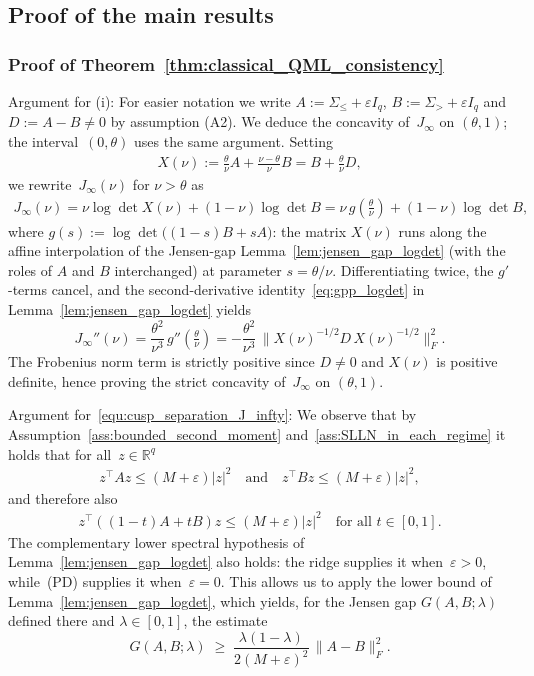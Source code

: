\documentclass[10pt, letterpaper]{amsart}
\begin{document}
\subsection{Proof of the main results}\label{sec:proof_main_results}

\subsubsection{Proof of Theorem~\ref{thm:classical_QML_consistency}}\label{sec:proof_consistency_infinite_signal_to_noise_ratio} 
Argument for (i): For easier notation we write $A:=\Sigma_{\le}+\varepsilon I_q$, $B:=\Sigma_{>}+\varepsilon I_q$ and $D:=A-B\neq 0$ by assumption (A2). We deduce the concavity of~$J_\infty$ on $(\theta,1)$; the interval~$(0,\theta)$ uses the same argument. Setting
\begin{align}
    X(\nu):=\frac{\theta}{\nu}A+\frac{\nu-\theta}{\nu}B
= B+\frac{\theta}{\nu}D ,
\end{align}
we rewrite~$J_\infty(\nu)$ for $\nu>\theta$ as
\begin{align}
J_\infty(\nu)=\nu\log\det X(\nu) + (1-\nu)\log\det B
=\nu\, g\!\left(\tfrac{\theta}{\nu}\right)+(1-\nu)\log\det B,
\end{align}
where $g(s):=\log\det\bigl((1-s)B+sA\bigr)$: the matrix $X(\nu)$ runs along the affine interpolation of the Jensen-gap Lemma~\ref{lem:jensen_gap_logdet} (with the roles of $A$ and $B$ interchanged) at parameter $s=\theta/\nu$. Differentiating twice, the $g'$-terms cancel, and the second-derivative identity~\eqref{eq:gpp_logdet} in Lemma~\ref{lem:jensen_gap_logdet} yields
\[
J_\infty''(\nu)
=\frac{\theta^2}{\nu^3}\, g''\!\left(\tfrac{\theta}{\nu}\right)
=
-\frac{\theta^2}{\nu^3}\,\big\|X(\nu)^{-1/2}D\,X(\nu)^{-1/2}\big\|_F^2.
\]
The Frobenius norm term is strictly positive since $D\neq 0$ and $X(\nu)$ is positive definite, hence proving the strict concavity of~$J_\infty$ on $(\theta,1)$.\smallskip

Argument for~\eqref{equ:cusp_separation_J_infty}: We observe that by Assumption~\ref{ass:bounded_second_moment} and~\ref{ass:SLLN_in_each_regime} it holds that for all~$z\in \mathbb{R}^q$ 
\begin{align}
    z^{\top} A z \leq (M+\varepsilon) |z|^2 \quad \mbox{and} \quad z^{\top} B z \leq (M+\varepsilon) |z|^2,
\end{align}
and therefore also 
\begin{align}
    z^{\top} ((1-t)A + tB) z \leq (M+\varepsilon) |z|^2 \quad \mbox{for all } t \in [0,1]. 
\end{align}
The complementary lower spectral hypothesis of
Lemma~\ref{lem:jensen_gap_logdet} also holds: the ridge supplies it
when~$\varepsilon>0$, while~(PD) supplies it when~$\varepsilon=0$.
This allows us to apply the lower bound of Lemma~\ref{lem:jensen_gap_logdet}, which yields, for the Jensen gap $G(A,B;\lambda)$ defined there and $\lambda\in[0,1]$, the estimate
\begin{equation}\label{eq:jensen_gap_lower}
G(A,B;\lambda)\;\ge\;\frac{\lambda(1-\lambda)}{2(M +\varepsilon)^2}\,\|A-B\|_F^2.
\end{equation}
\end{document}
